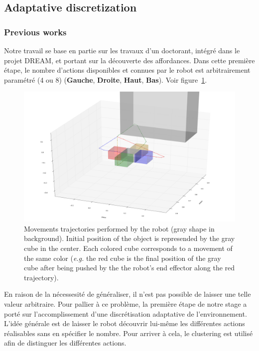 \documentclass{llncs}
\begin{document}
\subsection{Adaptative discretization}



\subsubsection{Previous works}

Notre travail se base en partie sur les travaux d'un doctorant, intégré dans le projet DREAM, et portant sur la découverte des affordances. Dans cette première étape, le nombre d'actions disponibles et connues par le robot est arbitrairement paramétré (4 ou 8) (\textbf{Gauche}, \textbf{Droite}, \textbf{Haut}, \textbf{Bas}). Voir figure~\ref{fig:trajectories}.

\begin{figure}
	\centering
	\includegraphics[width=\textwidth]{figures/trajectories}
	\caption{Movements trajectories performed by the robot (gray shape in background). Initial position of the object is represended by the gray cube in the center. Each colored cube corresponds to a movement of the same color (\textit{e.g.} the red cube is the final position of the gray cube after being pushed by the the robot's end effector along the red trajectory).}
	\label{fig:trajectories}
\end{figure}

En raison de la nécessesité de généraliser, il n'est pas possible de laisser une telle valeur arbitraire. Pour pallier à ce problème, la première étape de notre stage a porté sur l'accomplissement d'une discrétisation adaptative de l'environnement. L'idée générale est de laisser le robot découvrir lui-même les différentes actions réalisables sans en spécifier le nombre. Pour arriver à cela, le clustering est utilisé afin de distinguer les différentes actions. 
\end{document}

